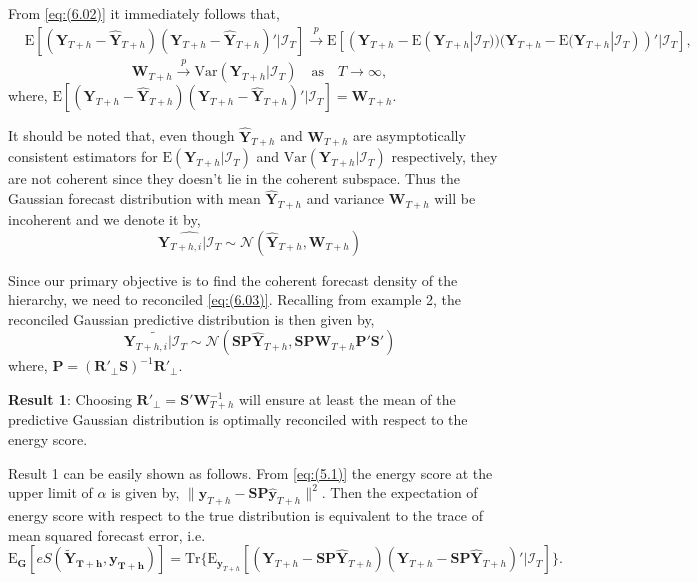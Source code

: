 \documentclass[a4paper, 11pt]{article}
\def\E{\text{E}}
\begin{document}
	From \eqref{eq:(6.02)} it immediately follows that,
	\begin{align*}
	&\E[(\bm{Y}_{T+h} - \hat{\bm{Y}}_{T+h})(\bm{Y}_{T+h} - \hat{\bm{Y}}_{T+h})'|\bm{\mathcal{I}}_T] \overset{p}{\to} \E[(\bm{Y}_{T+h} - \E(\bm{Y}_{T+h}|\bm{\mathcal{I}}_T))(\bm{Y}_{T+h} - \E(\bm{Y}_{T+h}|\bm{\mathcal{I}}_T))'|\bm{\mathcal{I}}_T],
	\end{align*}
	\begin{equation}
	\bm{W}_{T+h} \overset{p}{\to} \text{Var}(\bm{Y}_{T+h}|\bm{\mathcal{I}}_T) \quad \text{as} \quad T \to \infty,
	\end{equation}
	where, $\E[(\bm{Y}_{T+h} - \hat{\bm{Y}}_{T+h})(\bm{Y}_{T+h} - \hat{\bm{Y}}_{T+h})'|\bm{\mathcal{I}}_T] = \bm{W}_{T+h}$.
	
	It should be noted that, even though $\hat{\bm{Y}}_{T+h}$ and $\bm{W}_{T+h}$ are asymptotically consistent estimators for $\E(\bm{Y}_{T+h}|\bm{\mathcal{I}}_T)$ and $\text{Var}(\bm{Y}_{T+h}|\bm{\mathcal{I}}_T)$ respectively, they are not coherent since they doesn't lie in the coherent subspace. Thus the Gaussian forecast distribution with mean $\hat{\bm{Y}}_{T+h}$ and variance $\bm{W}_{T+h}$ will be incoherent and we denote it by,
	\begin{equation}\label{eq:(6.03)}
	\widehat{\bm{Y}_{T+h,i}|\bm{\mathcal{I}}_T} \sim \mathscr{N}(\hat{\bm{Y}}_{T+h}, \bm{W}_{T+h})
	\end{equation}
	
	Since our primary objective is to find the coherent forecast density of the hierarchy, we need to reconciled \eqref{eq:(6.03)}. Recalling from example 2, the reconciled Gaussian predictive distribution is then given by,
	\begin{equation}\label{eq:(6.04)}
	\widetilde{\bm{Y}_{T+h,i}|\bm{\mathcal{I}}_T} \sim \mathscr{N}(\bm{SP}\hat{\bm{Y}}_{T+h}, \bm{SP}\bm{W}_{T+h}\bm{P}'\bm{S}')
	\end{equation}
	where, $\bm{P} = (\bm{R}'_\bot \bm{S})^{-1}\bm{R}'_\bot$.
	
	\textbf{Result 1}: Choosing $\bm{R}'_\bot = \bm{S}'\bm{W}_{T+h}^{-1}$ will ensure at least the mean of the predictive Gaussian distribution is optimally reconciled with respect to the energy score.
	
	Result 1 can be easily shown as follows. From \eqref{eq:(5.1)} the energy score at the upper limit of $\alpha$ is given by, $\|\bm{y}_{T+h}-\bm{SP}\hat{\bm{y}}_{T+h}\|^2$. Then the expectation of energy score with respect to the true distribution is equivalent to the trace of mean squared forecast error, i.e.
	$$
	\E_{\bm{G}}[eS(\bm{\tilde{Y}_{T+h},y_{T+h}})]= \text{Tr}\{\E_{\bm{y}_{T+h}}[(\bm{Y}_{T+h}-\bm{SP}\hat{\bm{Y}}_{T+h})(\bm{Y}_{T+h}-\bm{SP}\hat{\bm{Y}}_{T+h})'|\mathcal{I}_{T}]\}.
	$$
	
\end{document}

